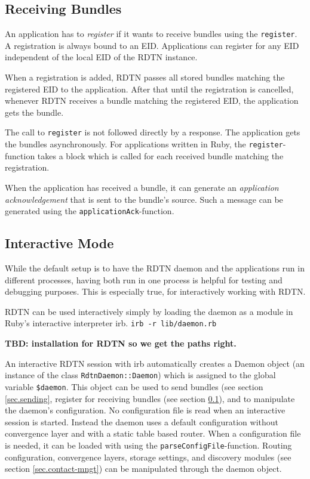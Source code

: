\documentclass{article}
\begin{document}
\subsection{Receiving Bundles}\label{sec.receiving}

An application has to {\em register} if it wants to receive bundles using the
{\tt register}. A registration is always bound to an EID. Applications can
register for any EID independent of the local EID of the RDTN instance.

When a registration is added, RDTN passes all stored bundles matching the
registered EID to the application. After that until the registration is
cancelled, whenever RDTN receives a bundle matching the registered EID, the
application gets the bundle.

The call to {\tt register} is not followed directly by a response. The
application gets the bundles asynchronously. For applications written in Ruby,
the {\tt register}-function takes a block which is called for each received
bundle matching the registration.

When the application has received a bundle, it can generate an {\em application
acknowledgement} that is sent to the bundle's source. Such a message can be
generated using the {\tt applicationAck}-function.

\subsection{Interactive Mode}\label{sec.interactive}

While the default setup is to have the RDTN daemon and the applications run in
different processes, having both run in one process is helpful for testing and
debugging purposes. This is especially true, for interactively working with
RDTN. 

RDTN can be used interactively simply by loading the daemon as a module in
Ruby's interactive interpreter irb. {\tt irb -r lib/daemon.rb}

{\bf TBD: installation for RDTN so we get the paths right.}

An interactive RDTN session with irb automatically creates a Daemon object (an
instance of the class {\tt RdtnDaemon::Daemon}) which is assigned to the global
variable {\tt \$daemon}. This object can be used to send bundles (see section
\ref{sec.sending}, register for receiving bundles (see section
\ref{sec.receiving}), and to manipulate the daemon's configuration. No
configuration file is read when an interactive session is started. Instead the
daemon uses a default configuration without convergence layer and with a static
table based router. When a configuration file is needed, it can be loaded with
using the {\tt parseConfigFile}-function. Routing configuration, convergence
layers, storage settings, and discovery modules (see section
\ref{sec.contact-mngt}) can be manipulated through the daemon object.
\end{document}
